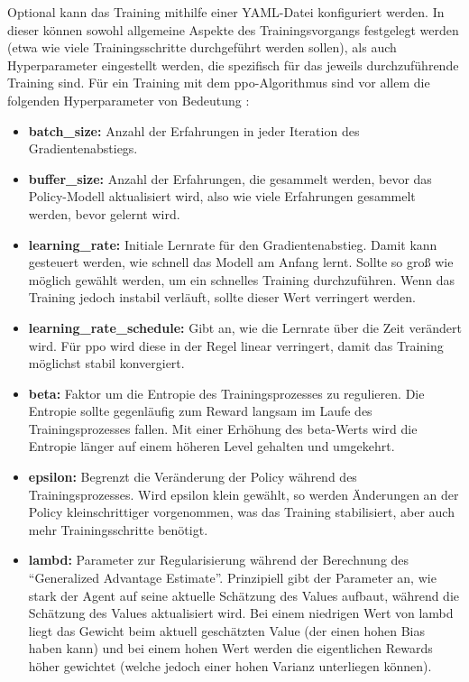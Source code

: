 Optional kann das Training mithilfe einer YAML-Datei konfiguriert werden.
In dieser können sowohl allgemeine Aspekte des Trainingsvorgangs festgelegt werden (etwa wie viele Trainingsschritte durchgeführt werden sollen), als auch Hyperparameter eingestellt werden, die spezifisch für das jeweils durchzuführende Training sind.
Für ein Training mit dem \ac{ppo}-Algorithmus sind vor allem die folgenden Hyperparameter von Bedeutung \cite{mlagentsHyperparameter}:
\begin{itemize}
    \item \textbf{batch\_size:} Anzahl der Erfahrungen in jeder Iteration des Gradientenabstiegs.
    \item \textbf{buffer\_size:} Anzahl der Erfahrungen, die gesammelt werden, bevor das Policy-Modell aktualisiert wird, also wie viele Erfahrungen gesammelt werden, bevor gelernt wird.
    \item \textbf{learning\_rate:} Initiale Lernrate für den Gradientenabstieg.
    Damit kann gesteuert werden, wie schnell das Modell am Anfang lernt.
    Sollte so groß wie möglich gewählt werden, um ein schnelles Training durchzuführen.
    Wenn das Training jedoch instabil verläuft, sollte dieser Wert verringert werden.
    \item \textbf{learning\_rate\_schedule:} Gibt an, wie die Lernrate über die Zeit verändert wird.
    Für \ac{ppo} wird diese in der Regel linear verringert, damit das Training möglichst stabil konvergiert.
    \item \textbf{beta:} Faktor um die Entropie des Trainingsprozesses zu regulieren.
    Die Entropie sollte gegenläufig zum Reward langsam im Laufe des Trainingsprozesses fallen.
    Mit einer Erhöhung des beta-Werts wird die Entropie länger auf einem höheren Level gehalten und umgekehrt.
    \item \textbf{epsilon:} Begrenzt die Veränderung der Policy während des Trainingsprozesses.
    Wird epsilon klein gewählt, so werden Änderungen an der Policy kleinschrittiger vorgenommen, was das Training stabilisiert, aber auch mehr Trainingsschritte benötigt.
    \item \textbf{lambd:} Parameter zur Regularisierung während der Berechnung des \enquote{Generalized Advantage Estimate}.
    Prinzipiell gibt der Parameter an, wie stark der Agent auf seine aktuelle Schätzung des Values aufbaut, während die Schätzung des Values aktualisiert wird.
    Bei einem niedrigen Wert von lambd liegt das Gewicht beim aktuell geschätzten Value (der einen hohen Bias haben kann) und bei einem hohen Wert werden die eigentlichen Rewards höher gewichtet (welche jedoch einer hohen Varianz unterliegen können).

\end{itemize}
